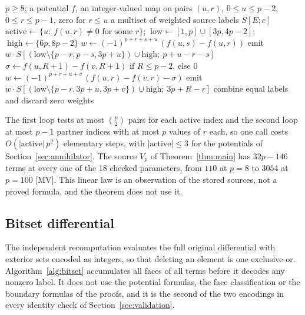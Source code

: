 \documentclass[11pt]{article}
\theoremstyle{definition}
\theoremstyle{remark}
\begin{document}
\begin{algorithm}[t]
\caption{Potential chain $P(f)$ in the sector with exterior high set $\{6p,8p-2\}$.}
\label{alg:potential}
\begin{algorithmic}[1]
\Require $p\geq8$; a potential $f$, an integer-valued map on pairs $(u,r)$, $0\leq u\leq p-2$, $0\leq r\leq p-1$, zero for $r\leq u$
\Ensure a multiset of weighted source labels $S[E;c]$
\State $\mathrm{active}\gets\{u:\ f(u,r)\ne0\text{ for some }r\}$; $\ \mathrm{low}\gets[1,p]\cup[3p,4p-2]$; $\ \mathrm{high}\gets\{6p,8p-2\}$
  \State $w\gets(-1)^{p+r+s+u}\,(f(u,s)-f(u,r))$
  \State emit $w\cdot S[(\mathrm{low}\setminus\{p-r,p-s,3p+u\})\cup\mathrm{high};\ p+u-r-s]$
\EndFor
{}
  \State $\sigma\gets f(u,R+1)-f(v,R+1)$ if $R\leq p-2$, else $0$
    \State $w\gets(-1)^{p+r+u+v}\,(f(u,r)-f(v,r)-\sigma)$
    \State emit $w\cdot S[(\mathrm{low}\setminus\{p-r,3p+u,3p+v\})\cup\mathrm{high};\ 3p+R-r]$
  \EndFor
\EndFor
\State combine equal labels and discard zero weights
\end{algorithmic}
\end{algorithm}

The first loop tests at most $\binom p2$ pairs for each active index and the
second loop at most $p-1$ partner indices with at most $p$ values of $r$ each, so
one call costs $O(|\mathrm{active}|\,p^2)$ elementary steps, with $|\mathrm{active}|\leq3$
for the potentials of Section~\ref{sec:annihilator}. The source
$V_p$ of Theorem~\ref{thm:main} has $32p-146$ terms at every one of the 18
checked parameters, from $110$ at $p=8$ to $3054$ at $p=100$ [MV]. This linear
law is an observation of the stored sources, not a proved formula, and the
theorem does not use it.

\subsection{Bitset differential}

The independent recomputation evaluates the full original differential with
exterior sets encoded as integers, so that deleting an element is one exclusive-or.
Algorithm~\ref{alg:bitset} accumulates all faces of all terms before it decodes
any nonzero label. It does not use the potential formulas, the face
classification or the boundary formulas of the proofs, and it is the second of the
two encodings in every identity check of Section~\ref{sec:validation}.
\end{document}
